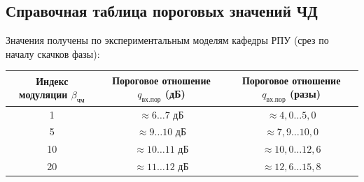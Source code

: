 \documentclass[12pt,a4paper]{article}
\begin{document}
\subsection{Справочная таблица пороговых значений ЧД}
Значения получены по экспериментальным моделям кафедры РПУ (срез по началу скачков фазы):
\begin{center}
\begin{tabular}{ccc}
\toprule
\textbf{Индекс модуляции $\beta_{\text{чм}}$} & \textbf{Пороговое отношение $q_{\text{вх.пор}}$ (дБ)} & \textbf{Пороговое отношение $q_{\text{вх.пор}}$ (разы)} \\
\midrule
1  & $\approx 6\dots 7\text{ дБ}$   & $\approx 4{,}0\dots 5{,}0$ \\
5  & $\approx 9\dots 10\text{ дБ}$  & $\approx 7{,}9\dots 10{,}0$ \\
10 & $\approx 10\dots 11\text{ дБ}$ & $\approx 10{,}0\dots 12{,}6$ \\
20 & $\approx 11\dots 12\text{ дБ}$ & $\approx 12{,}6\dots 15{,}8$ \\
\bottomrule
\end{tabular}
\end{center}
\end{document}
